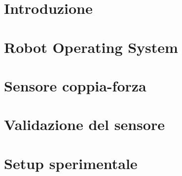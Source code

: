 \thispagestyle{empty} %
\cleardoublepage

\thispagestyle{empty}

\clearpage{\pagestyle{plain}\cleardoublepage}


\clearpage{\pagestyle{plain}\cleardoublepage}
\tableofcontents %

\clearpage{\pagestyle{plain}\cleardoublepage} %

\clearpage{\pagestyle{plain}\cleardoublepage} %
\chapter*{Introduzione} %

\clearpage{\pagestyle{plain}\cleardoublepage} %
\chapter{Robot Operating System} %
\label{chapter:chapter1} %

\clearpage{\pagestyle{plain}\cleardoublepage} %
\chapter{Sensore coppia-forza} %
\label{chapter:chapter2} %

\clearpage{\pagestyle{plain}\cleardoublepage} %
\chapter{Validazione del sensore} %
\label{chapter:chapter3} %

\clearpage{\pagestyle{plain}\cleardoublepage} %
\chapter{Setup sperimentale} %
\label{chapter:chapter4} %

